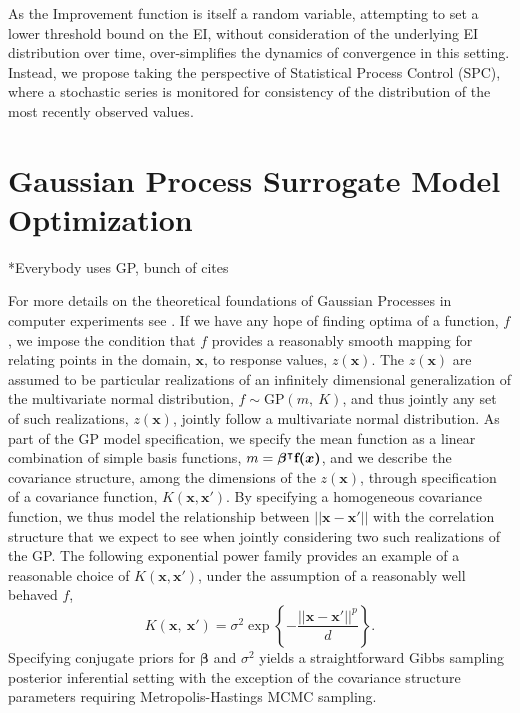 \documentclass[12pt]{article}
\begin{document}
%
%

%
As the Improvement function is itself a random variable, attempting to 
set a lower threshold bound on the EI, without consideration of the underlying 
EI distribution over time, over-simplifies the dynamics of convergence
in this setting. 
%
Instead, we propose taking the perspective of Statistical
Process Control (SPC), where a stochastic series is monitored for 
consistency of the distribution of the most recently observed values.

%
%
\section{Gaussian Process Surrogate Model Optimization}
%
%

{\color{red} *Everybody uses GP, bunch of cites}

%
For more details on the theoretical foundations of Gaussian Processes in computer experiments see \cite{santnerBook}.
%
If we have any hope of finding optima of a function, $f$, we impose the condition that $f$ provides a reasonably smooth mapping for relating points in the domain, $\bm{x}$, to response values, $z(\bm{x})$.
The $z(\bm{x})$ are assumed to be particular realizations of an infinitely dimensional generalization of the multivariate normal distribution, $f \sim \text{GP}(m,~K)$, and thus jointly any set of such realizations, $z(\bm{x})$, jointly follow a multivariate normal distribution.
%
As part of the GP model specification, we specify the mean function as a linear combination of simple basis functions, $m=\bm{\beta}^\intercal \text{\textbf{f($\bm{x}
$)}}$, and we describe the covariance structure, among the dimensions of the $z(\bm{x})$, through specification of a covariance function, $K(\bm{x}, \bm{x}')$.
%
By specifying a homogeneous covariance function, we thus model the relationship between $||\bm{x}-\bm{x}'||$ with the correlation structure that we expect to see when jointly considering two such realizations of the GP. 
%
The following exponential power family provides an example of a reasonable choice of $K(\bm{x}, \bm{x}')$, under the assumption of a reasonably well behaved $f$,
%
\begin{equation}
K(\bm{x}, ~\bm{x}') = \sigma^2\exp\left\{ -\frac{||\bm{x}-\bm{x}'||^p}{d} \right\}.
\label{corrFunc}
\end{equation} 
%
Specifying conjugate priors for $\bm{\beta}$ and $\sigma^2$ yields a straightforward Gibbs sampling posterior inferential setting with the exception of the covariance structure parameters requiring Metropolis-Hastings MCMC sampling.
\end{document}
